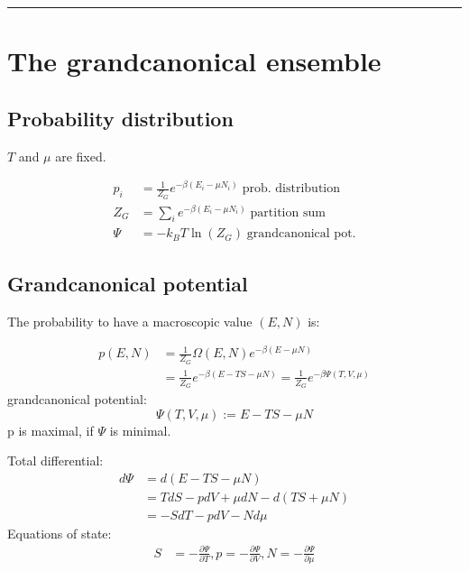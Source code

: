 \noindent\rule[1ex]{\textwidth/5}{1pt}
\section{The grandcanonical ensemble}

\subsection*{Probability distribution}
$T$ and $\mu$ are fixed.

\begin{equation*}
    \begin{aligned}
        p_i &= \frac{1}{Z_G} e^{-\beta (E_i - \mu N_i)} \; \text{prob. distribution} \\
        Z_G &= \sum_i e^{-\beta (E_i - \mu N_i)} \; \text{partition sum} \\
        \Psi &= -k_B T \ln(Z_G) \; \text{grandcanonical pot.}
    \end{aligned}
\end{equation*}

\subsection*{Grandcanonical potential}
The probability to have a macroscopic value $(E,N)$ is:

\begin{equation*}
    \begin{aligned}
        p(E,N) &= \frac{1}{Z_G} \Omega(E,N) e^{-\beta(E-\mu N)} \\
            &= \frac{1}{Z_G} e^{-\beta(E-TS-\mu N)} = \frac{1}{Z_G} e^{-\beta \Psi(T,V,\mu)}
    \end{aligned}
\end{equation*}
grandcanonical potential:
\begin{equation*}
    \Psi(T,V,\mu) := E-TS-\mu N
\end{equation*}
p is maximal, if $\Psi$ is minimal. 

Total differential:
\begin{equation*}
    \begin{aligned}
        d\Psi &= d(E-TS-\mu N) \\
            &= TdS - pdV + \mu dN - d(TS + \mu N) \\
            &= -SdT -pdV - Nd\mu
    \end{aligned}
\end{equation*}
Equations of state:
\begin{equation*}
    \begin{aligned}
        S &= - \frac{\partial \Psi}{\partial T} , p = - \frac{\partial \Psi}{\partial V}, N = - \frac{\partial \Psi}{\partial \mu}
    \end{aligned}
\end{equation*}

